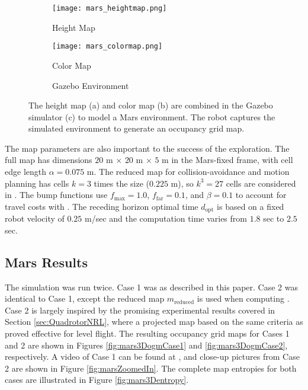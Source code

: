 \begin{figure}[!t]
	\centering
	\begin{subfigure}[t]{0.3\columnwidth}
           	\centering
          	\texttt{[image: mars\_heightmap.png]}
        		\caption{Height Map}
    	\end{subfigure}
    	\begin{subfigure}[t]{0.3\columnwidth}
           	\centering
          	\texttt{[image: mars\_colormap.png]}
        		\caption{Color Map}
    	\end{subfigure}
    	\begin{subfigure}[t]{0.3\columnwidth}
        		\caption{Gazebo Environment}
    	\end{subfigure}
\caption{The height map (a) and color map (b) are combined in the Gazebo simulator (c) to model a Mars environment. The robot captures the simulated environment to generate an occupancy grid map.}
\label{fig:MarsGazebo}
\end{figure}

The map parameters are also important to the success of the exploration. The full map has dimensions $20$ m $\times$ $20$ m $\times$ $5$ m in the Mars-fixed frame, with cell edge length $\alpha=0.075$ m. The reduced map for collision-avoidance and motion planning has cells $k=3$ times the size ($0.225$ m), so $k^3=27$ cells are considered in . The bump functions use $f_\text{max}=1.0$, $f_\text{far}=0.1$, and $\beta=0.1$ to account for travel costs with . The receding horizon optimal time $d_\text{opt}$ is based on a fixed robot velocity of $0.25$ m/sec and the computation time varies from $1.8$ sec to $2.5$ sec.

\subsection{Mars Results}

The simulation was run twice. Case 1 was as described in this paper. Case 2 was identical to Case 1, except the reduced map $ m_\text{reduced}$ is used when computing . Case 2 is largely inspired by the promising experimental results covered in Section \ref{sec:QuadrotorNRL}, where a projected map based on the same criteria as  proved effective for level flight. The resulting occupancy grid maps for Cases 1 and 2 are shown in Figures \ref{fig:mars3DogmCase1} and \ref{fig:mars3DogmCase2}, respectively. A video of Case 1 can be found at \href{https://youtu.be/FrBcL2UMW9w}{}, and close-up pictures from Case 2 are shown in Figure \ref{fig:marsZoomedIn}. The complete map entropies for both cases are illustrated in Figure \ref{fig:mars3Dentropy}.


